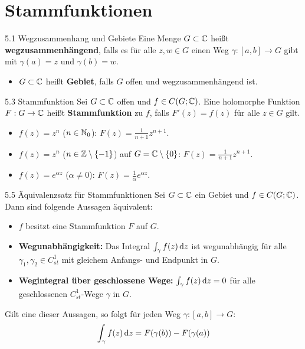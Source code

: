 \section{Stammfunktionen}

\begin{defi}{5.1 Wegzusammenhang und Gebiete}
Eine Menge $G \subset \mathbb{C}$ heißt \textbf{wegzusammenhängend}, falls es für alle $z, w \in G$ einen Weg $\gamma: [a,b] \to G$ gibt mit $\gamma(a) = z$ und $\gamma(b) = w$.
\begin{itemize}
    \item $G \subset \mathbb{C}$ heißt \textbf{Gebiet}, falls $G$ offen und wegzusammenhängend ist.
\end{itemize}
\end{defi}

\begin{defi}{5.3 Stammfunktion}
Sei $G \subset \mathbb{C}$ offen und $f \in C(G; \mathbb{C})$. Eine holomorphe Funktion $F: G \to \mathbb{C}$ heißt \textbf{Stammfunktion} zu $f$, falls $F'(z) = f(z)$ für alle $z \in G$ gilt.
\end{defi}

\begin{tcolorbox}[colback=white, colframe=black!70, title={Bsp. 5.4 Beispiele für Stammfunktionen}]
\begin{itemize}
    \item[i)] $f(z) = z^n$ ($n \in \mathbb{N}_0$): $F(z) = \frac{1}{n+1} z^{n+1}$.
    \item[ii)] $f(z) = z^n$ ($n \in \mathbb{Z} \setminus \{-1\}$) auf $G = \mathbb{C} \setminus \{0\}$: $F(z) = \frac{1}{n+1} z^{n+1}$.
    \item[iii)] $f(z) = e^{\alpha z}$ ($\alpha \neq 0$): $F(z) = \frac{1}{\alpha} e^{\alpha z}$.
\end{itemize}
\end{tcolorbox}

\begin{satz}{5.5 Äquivalenzsatz für Stammfunktionen}
Sei $G \subset \mathbb{C}$ ein Gebiet und $f \in C(G; \mathbb{C})$. Dann sind folgende Aussagen äquivalent:
\begin{itemize}
    \item[i)] $f$ besitzt eine Stammfunktion $F$ auf $G$.
    \item[ii)] \textbf{Wegunabhängigkeit:} Das Integral $\int_\gamma f(z) \, \mathrm{d}z$ ist wegunabhängig für alle $\gamma_1, \gamma_2 \in C_{st}^1$ mit gleichem Anfangs- und Endpunkt in $G$.
    \item[iii)] \textbf{Wegintegral über geschlossene Wege:} $\int_\gamma f(z) \, \mathrm{d}z = 0$ für alle geschlossenen $C_{st}^1$-Wege $\gamma$ in $G$.
\end{itemize}
Gilt eine dieser Aussagen, so folgt für jeden Weg $\gamma: [a,b] \to G$:
\[
    \int_\gamma f(z) \, \mathrm{d}z = F(\gamma(b)) - F(\gamma(a))
\]
\end{satz}

